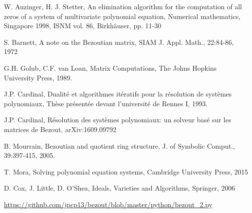 \documentclass{standalone}
\begin{document}
  \begin{thebibliography}{00}

  {W. Auzinger, H. J. Stetter},
  {An elimination algorithm for the computation of all zeros of a system of multivariate polynomial equation},
  {Numerical mathematics, Singapore 1998, ISNM vol. 86, Birkhäuser, pp. 11-30}

  {S. Barnett}, {A note on the Bezoutian matrix},
  {SIAM J. Appl. Math., 22:84-86}, {1972}

  {G.H. Golub, C.F. van Loan},
  {Matrix Computations}, {The Johns Hopkins University Press}, {1989}.

  {J.P. Cardinal}, 
  {Dualit\'e et algorithmes it\'eratifs pour la r\'esolution de syst\`emes polynomiaux}, 
  {Th\`ese pr\'esent\'ee devant l'universit\'e de Rennes I}, {1993}.

  {J.P. Cardinal}, 
  {R\'esolution des syst\`emes polynomiaux: un solveur bas\'e sur les matrices de Bezout},
  {arXiv:1609.09792}
 	
  {B. Mourrain}, {Bezoutian and quotient ring structure},
  {J. of Symbolic Comput., 39:397-415}, {2005}.

  {T. Mora}, {Solving polynomial equation systems}, {Cambridge University Press}, {2015}

  {D. Cox, J. Little, D. O'Shea},
  {Ideals, Varieties and Algorithms}, {Springer}, {2006}

  \url{https://github.com/jpcp13/bezout/blob/master/python/bezout_2.py}

  \end{thebibliography}
\end{document}
